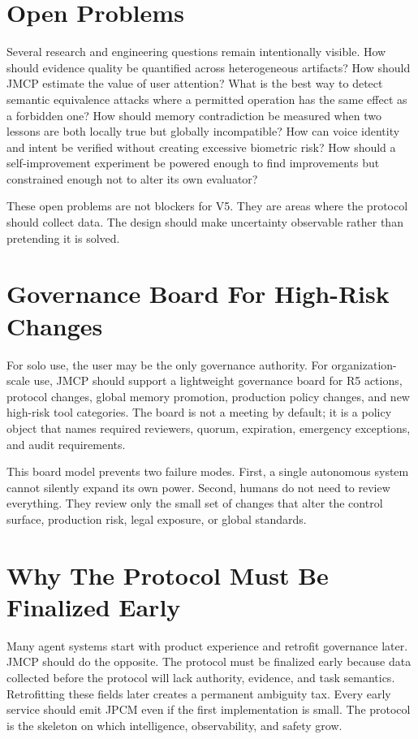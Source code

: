 \documentclass[10pt,journal,onecolumn]{IEEEtran}
\begin{document}
\section{Open Problems}
Several research and engineering questions remain intentionally visible. How should evidence quality be quantified across heterogeneous artifacts? How should JMCP estimate the value of user attention? What is the best way to detect semantic equivalence attacks where a permitted operation has the same effect as a forbidden one? How should memory contradiction be measured when two lessons are both locally true but globally incompatible? How can voice identity and intent be verified without creating excessive biometric risk? How should a self-improvement experiment be powered enough to find improvements but constrained enough not to alter its own evaluator?

These open problems are not blockers for V5. They are areas where the protocol should collect data. The design should make uncertainty observable rather than pretending it is solved.

\section{Governance Board For High-Risk Changes}
For solo use, the user may be the only governance authority. For organization-scale use, JMCP should support a lightweight governance board for R5 actions, protocol changes, global memory promotion, production policy changes, and new high-risk tool categories. The board is not a meeting by default; it is a policy object that names required reviewers, quorum, expiration, emergency exceptions, and audit requirements.

This board model prevents two failure modes. First, a single autonomous system cannot silently expand its own power. Second, humans do not need to review everything. They review only the small set of changes that alter the control surface, production risk, legal exposure, or global standards.

\section{Why The Protocol Must Be Finalized Early}
Many agent systems start with product experience and retrofit governance later. JMCP should do the opposite. The protocol must be finalized early because data collected before the protocol will lack authority, evidence, and task semantics. Retrofitting these fields later creates a permanent ambiguity tax. Every early service should emit JPCM even if the first implementation is small. The protocol is the skeleton on which intelligence, observability, and safety grow.
\end{document}
